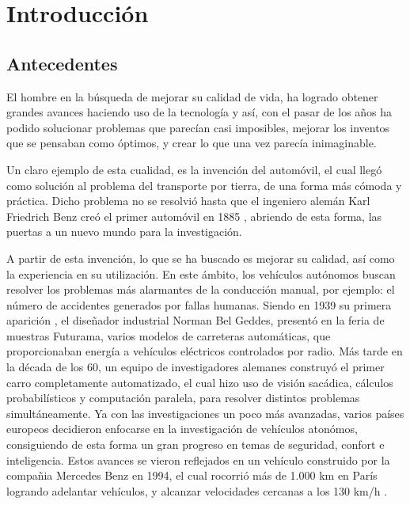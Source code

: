\chapter{Introducción}\label{sec:capitulo1}
\thispagestyle{empty}

\begingroup
{}
\small

\endgroup

\section{Antecedentes}
El hombre en la búsqueda de mejorar su calidad de vida, ha logrado obtener grandes avances haciendo uso de la tecnología y así, con el pasar de los años ha podido solucionar problemas que parecían casi imposibles, mejorar los inventos que se pensaban como óptimos, y crear lo que una vez parecía inimaginable.\\ 

\par Un claro ejemplo de esta cualidad, es la invención del automóvil, el cual llegó como solución al problema del transporte por tierra, de una forma más cómoda y práctica. Dicho problema no se resolvió hasta que el ingeniero alemán Karl Friedrich Benz creó el primer automóvil en 1885 \cite{cernuschi2005cuatro}, abriendo de esta forma, las puertas a un nuevo mundo para la investigación.\\

\par A partir de esta invención, lo que se ha buscado es mejorar su calidad, así como la experiencia en su utilización. En este ámbito, los vehículos autónomos buscan resolver los problemas más alarmantes de la conducción manual, por ejemplo: el número de accidentes generados por fallas humanas. Siendo en 1939  su primera aparición \cite{VeA}, el diseñador industrial Norman Bel Geddes, presentó en la feria de muestras Futurama, varios modelos de carreteras automáticas, que proporcionaban energía a vehículos eléctricos controlados por radio. Más tarde en la década de los 60, un equipo de investigadores alemanes construyó el primer carro completamente automatizado, el cual hizo uso de visión sacádica, cálculos probabilísticos y computación paralela, para resolver distintos problemas simultáneamente. Ya con las investigaciones un poco más avanzadas, varios países europeos decidieron enfocarse en la investigación de vehículos atonómos, consiguiendo de esta forma un gran progreso en temas de seguridad, confort e inteligencia. Estos avances se vieron reflejados en un vehículo construido por la compañia Mercedes Benz en 1994, el cual rocorrió más de 1.000 km en París logrando adelantar vehículos, y alcanzar velocidades cercanas a los 130 km/h \cite{carreno2012diseno}.\\  

